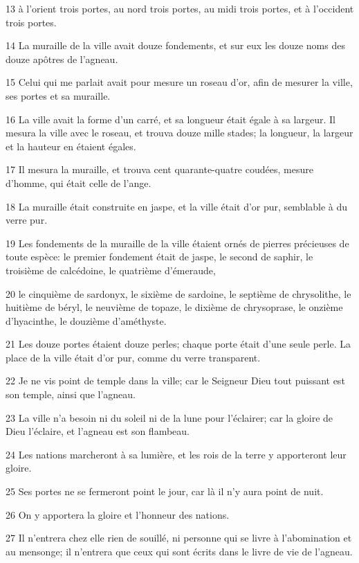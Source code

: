 \par 13 à l'orient trois portes, au nord trois portes, au midi trois portes, et à l'occident trois portes.
\par 14 La muraille de la ville avait douze fondements, et sur eux les douze noms des douze apôtres de l'agneau.
\par 15 Celui qui me parlait avait pour mesure un roseau d'or, afin de mesurer la ville, ses portes et sa muraille.
\par 16 La ville avait la forme d'un carré, et sa longueur était égale à sa largeur. Il mesura la ville avec le roseau, et trouva douze mille stades; la longueur, la largeur et la hauteur en étaient égales.
\par 17 Il mesura la muraille, et trouva cent quarante-quatre coudées, mesure d'homme, qui était celle de l'ange.
\par 18 La muraille était construite en jaspe, et la ville était d'or pur, semblable à du verre pur.
\par 19 Les fondements de la muraille de la ville étaient ornés de pierres précieuses de toute espèce: le premier fondement était de jaspe, le second de saphir, le troisième de calcédoine, le quatrième d'émeraude,
\par 20 le cinquième de sardonyx, le sixième de sardoine, le septième de chrysolithe, le huitième de béryl, le neuvième de topaze, le dixième de chrysoprase, le onzième d'hyacinthe, le douzième d'améthyste.
\par 21 Les douze portes étaient douze perles; chaque porte était d'une seule perle. La place de la ville était d'or pur, comme du verre transparent.
\par 22 Je ne vis point de temple dans la ville; car le Seigneur Dieu tout puissant est son temple, ainsi que l'agneau.
\par 23 La ville n'a besoin ni du soleil ni de la lune pour l'éclairer; car la gloire de Dieu l'éclaire, et l'agneau est son flambeau.
\par 24 Les nations marcheront à sa lumière, et les rois de la terre y apporteront leur gloire.
\par 25 Ses portes ne se fermeront point le jour, car là il n'y aura point de nuit.
\par 26 On y apportera la gloire et l'honneur des nations.
\par 27 Il n'entrera chez elle rien de souillé, ni personne qui se livre à l'abomination et au mensonge; il n'entrera que ceux qui sont écrits dans le livre de vie de l'agneau.

